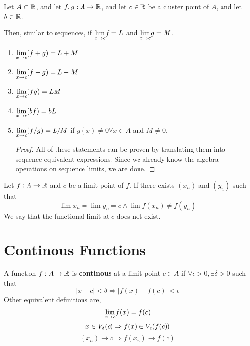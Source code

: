 \begin{theorem}
    Let $A \subset {\mathbb{R}}$, and let $f,g: A \to {\mathbb{R}}$, and let $c \in {\mathbb{R}}$ be a cluster point of $A$, and let $b \in {\mathbb{R}}$.

    Then, similar to sequences, if $\underset{x \to c}{\lim}f = L$ and $\underset{x \to c}{\lim}g = M$.
    \begin{enumerate}
        \item $\underset{x \to c}{\lim} (f+g) = L + M$
        \item $\underset{x \to c}{\lim} (f-g) = L - M$
        \item $\underset{x \to c}{\lim} (fg) = LM$
        \item $\underset{x \to c}{\lim} (bf) = bL$
        \item $\underset{x \to c}{\lim} (f/g) = L/M$ if $g(x) \neq 0  \forall x \in A$ and $M \neq 0$.
              \begin{proof}
                  All of these statements can be proven by translating them into sequence equivalent expressions. Since we already know the algebra operations on sequence limits, we are done.
              \end{proof}
    \end{enumerate}
\end{theorem}

\begin{definition}
    Let $f: A \to {\mathbb{R}}$ and $c$ be a limit point of $f$. If there exists $(x_n)$ and $(y_n)$ such that
    \[ \lim x_n = \lim y_n = c \land \lim f(x_n) \neq f(y_n)\]
    We say that the functional limit at $c$ does not exist.
\end{definition}
\section{Continous Functions}
\begin{definition}
    A function $f: A \to {\mathbb{R}}$ is \textbf{continous} at a limit point $c \in A$ if $\forall \epsilon >0, \exists \delta >0$ such that
    \[ |x-c|< \delta \Rightarrow |f(x) - f(c)| <\epsilon\]
    Other equivalent definitions are,
    \[\underset{x \to c}{\lim}f(x) = f(c)\]
    \[ x \in V_{\delta}(c) \Rightarrow f(x) \in V_{\epsilon}(f(c))\]
    \[ (x_n) \to c \Rightarrow f(x_n) \to f(c)\]
\end{definition}

